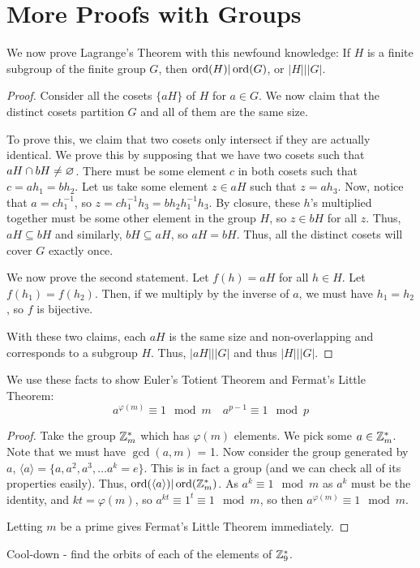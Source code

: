 \documentclass[11pt,twosided]{article}
\begin{document}
\section{More Proofs with Groups}
We now prove Lagrange's Theorem with this newfound knowledge: If $H$ is a finite subgroup of the finite group $G$, then $\operatorname{ord}(H) | \operatorname{ord}(G)$, or $|H| | |G|$. 
\begin{proof}
Consider all the cosets $\{ aH \}$ of $H$ for $a \in G$. We now claim that the distinct cosets partition $G$ and all of them are the same size. 

To prove this, we claim that two cosets only intersect if they are actually identical. We prove this by supposing that we have two cosets such that $aH \cap bH \neq \varnothing$. There must be some element $c$ in both cosets such that $c = ah_1 = bh_2$. Let us take some element $z \in aH$ such that $z = ah_3$. Now, notice that $a = ch_1^{-1}$, so $z = ch_1^{-1}h_3 = bh_2 h_1^{-1} h_3$. By closure, these $h$'s multiplied together must be some other element in the group $H$, so $z \in bH$ for all $z$. Thus, $aH \subseteq bH$ and similarly, $bH \subseteq aH$, so $aH = bH$. Thus, all the distinct cosets will cover $G$ exactly once. 

We now prove the second statement. Let $f(h) = aH$ for all $h \in H$. Let $f(h_1) = f(h_2)$. Then, if we multiply by the inverse of $a$, we must have $h_1 = h_2$, so $f$ is bijective. 

With these two claims, each $aH$ is the same size and non-overlapping and corresponds to a subgroup $H$. Thus, $|aH| | |G|$ and thus $|H| | |G|$. 

\end{proof}

We use these facts to show Euler's Totient Theorem and Fermat's Little Theorem: 
\[
	a^{\varphi(m)} \equiv 1 \mod m \quad a^{p-1} \equiv 1 \mod p
\]
\begin{proof}
Take the group $\mathbb Z_m^*$ which has $\varphi(m)$ elements. We pick some $a \in \mathbb Z_m^*$. Note that we must have $\gcd(a, m)$ = 1. Now consider the group generated by $a$, $\langle a \rangle = \{ a, a^2, a^3, \ldots a^k = e\}$. This is in fact a group (and we can check all of its properties easily). Thus, $\operatorname{ord}(\langle a \rangle) | \operatorname{ord}( \mathbb Z_m^*)$. As $a^k \equiv 1 \mod m$ as $a^k$ must be the identity, and $kt = \varphi(m)$, so $a^{kt} \equiv 1^t \equiv 1 \mod m$, so then $a^{\varphi(m)} \equiv 1 \mod m$. 

Letting $m$ be a prime gives Fermat's Little Theorem immediately. 




\end{proof}



Cool-down - find the orbits of each of the elements of $\mathbb Z_9^*$. 

\end{document}
